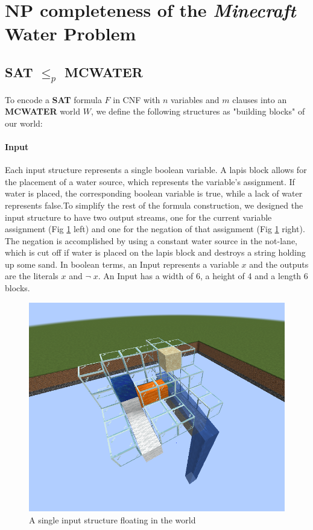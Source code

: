 \section{NP completeness of the \textit{Minecraft} Water Problem}


\subsection{\textbf{SAT} $\leq_p$ \textbf{MCWATER}}
To encode a \textbf{SAT} formula $F$ in CNF with $n$ variables and $m$ clauses into an \textbf{MCWATER} world $W$, we define the following structures as "building blocks" of our world:



\paragraph{Input}
Each input structure represents a single boolean variable. A lapis block allows for the placement of a water source, which represents the variable's assignment. If water is placed, the corresponding boolean variable is true, while a lack of water represents false.\newline To simplify the rest of the formula construction, we designed the input structure to have two output streams, one for the current variable assignment (Fig \ref{fig:input} left) and one for the negation of that assignment (Fig \ref{fig:input} right). The negation is accomplished by using a constant water source in the not-lane, which is cut off if water is placed on the lapis block and destroys a string holding up some sand. In boolean terms, an Input represents a variable $x$ and the outputs are the literals $x$ and $\neg \; x$. An Input has a width of 6, a height of 4 and a length 6 blocks.

\begin{figure}[ht]
    \centering
    \includegraphics[width=0.5\linewidth]{images/input.png}
    \caption{A single input structure floating in the world}
    \label{fig:input}
\end{figure}



